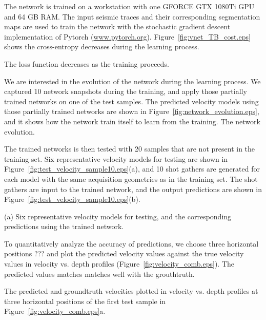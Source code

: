\documentclass{segabs}
\begin{document}
The network is trained on a workstation with one GFORCE GTX 1080Ti GPU and 64 GB RAM. The input seismic traces and their corresponding segmentation maps are used to train the network with the stochastic gradient descent implementation of Pytorch (\url{www.pytorch.org}). Figure~\ref{fig:vnet_TB_cost.eps} shows the cross-entropy decreases during the learning process.

{The loss function decreases as the training proceeds.}

We are interested in the evolution of the network during the learning process. We captured 10 network snapshots during the training, and apply those partially trained networks on one of the test samples. The predicted velocity models using those partially trained networks are shown in Figure~\ref{fig:network_evolution.eps}, and it shows how the network train itself to learn from the training. 
{The network evolution.}

The trained networks is then tested with 20 samples that are not present in the training set. Six representative velocity models for testing are shown in Figure~\ref{fig:test_velocity_sample10.eps}(a), and 10 shot gathers are generated for each model with the same acquisition geometries as in the training set. The shot gathers are input to the trained network, and the output predictions are shown in Figure~\ref{fig:test_velocity_sample10.eps}(b).

{(a) Six representative velocity models for testing, and the corresponding predictions using the trained network.}

To quantitatively analyze the accuracy of predictions, we choose three horizontal positions ??? and plot the predicted velocity values against the true velocity values in velocity vs. depth profiles (Figure~\ref{fig:velocity_comb.eps}). The predicted values matches matches well with the grouthtruth.

{The predicted and groundtruth velocities plotted in velocity vs. depth profiles at three horizontal positions of the first test sample in Figure~\ref{fig:velocity_comb.eps}a}.


\end{document}
